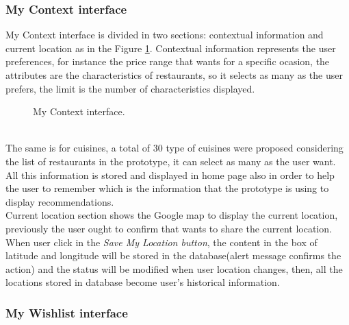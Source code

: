 \subsubsection{My Context interface}

My Context interface is divided in two sections: contextual 
information and current location as in the Figure  \ref{fig:mycontext}.
Contextual information represents the user preferences, for instance
the price range that wants for a specific ocasion, the attributes are
the characteristics of restaurants, so it selects as many as the user
prefers, the limit is the number of characteristics displayed. 
 \begin{figure}
\captionsetup{font=footnotesize}
\centering
{}
\caption{My Context interface.}
\label{fig:mycontext}   
\end{figure}
\\The same is for cuisines, a total of 30 type of cuisines were
proposed considering the list of restaurants in the prototype, it can
select as many as the user want.  \\All this information is stored and
displayed in home page also in order to help the user to remember
which is the information that the prototype is using to display
recommendations.\\  Current location section shows the Google map to
display the current location, previously the user ought to confirm
that wants to share the current location. \\  When user click in the
\textit{Save My Location button}, the content in the box of latitude
and longitude will be stored in the database(alert message  confirms
the action) and the status will be modified when user location
changes, then, all the locations stored in database become user's
historical information.

\subsubsection{My Wishlist interface}

